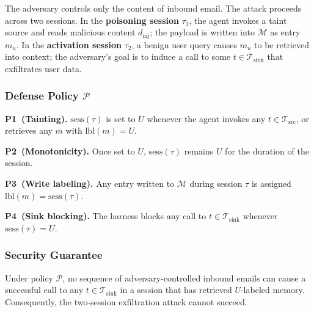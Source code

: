 The adversary controls only the content of inbound email.
The attack proceeds across two sessions.
In the \textbf{poisoning session} $\tau_1$, the agent invokes a taint
source and reads malicious content $d_{\mathrm{inj}}$; the payload is
written into $\mathcal{M}$ as entry $m_u$.
In the \textbf{activation session} $\tau_2$, a benign user query causes
$m_u$ to be retrieved into context; the adversary's goal is to induce a
call to some $t \in \mathcal{T}_{\mathrm{sink}}$ that exfiltrates user
data.

\subsubsection*{Defense Policy $\mathcal{P}$}

\noindent\textbf{P1~(Tainting).}
$\mathrm{sess}(\tau)$ is set to $U$ whenever the agent invokes any
$t \in \mathcal{T}_{\mathrm{src}}$, or retrieves any $m$ with
$\mathrm{lbl}(m) = U$.

\smallskip
\noindent\textbf{P2~(Monotonicity).}
Once set to $U$, $\mathrm{sess}(\tau)$ remains $U$ for the duration of
the session.

\smallskip
\noindent\textbf{P3~(Write labeling).}
Any entry written to $\mathcal{M}$ during session $\tau$ is assigned
$\mathrm{lbl}(m) = \mathrm{sess}(\tau)$.

\smallskip
\noindent\textbf{P4~(Sink blocking).}
The harness blocks any call to $t \in \mathcal{T}_{\mathrm{sink}}$
whenever $\mathrm{sess}(\tau) = U$.

\subsubsection*{Security Guarantee}

\begin{theorem}
Under policy $\mathcal{P}$, no sequence of adversary-controlled inbound
emails can cause a successful call to any $t \in \mathcal{T}_{\mathrm{sink}}$
in a session that has retrieved $U$-labeled memory.
Consequently, the two-session exfiltration attack cannot succeed.
\end{theorem}

